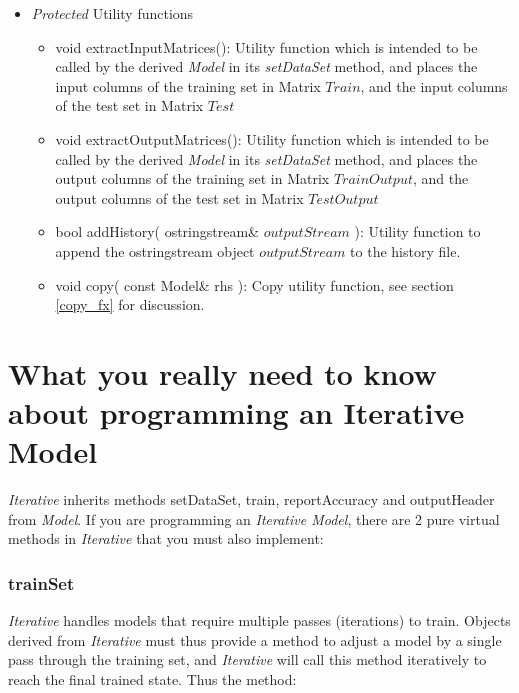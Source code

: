 \documentclass{report}
\def\beginred{\color{red}}
\def\endcolor{\color{black}}
\begin{document}
\begin{itemize}
\item {\em Protected} Utility functions

\begin{itemize}
\item \beginred void extractInputMatrices(): Utility function which is
      intended to be called by the derived {\em Model} in its {\em
      setDataSet} method, and places the input columns of the training
      set in Matrix $Train$, and the input columns of the test set in
      Matrix $Test$ \endcolor
\item \beginred void extractOutputMatrices(): Utility function which
      is intended to be called by the derived {\em Model} in its {\em
      setDataSet} method, and places the output columns of the
      training set in Matrix $TrainOutput$, and the output columns of
      the test set in Matrix $TestOutput$ \endcolor
\item \beginred bool addHistory( ostringstream\& $outputStream$ ):
      Utility function to append the ostringstream object
      $outputStream$
      to the history file. \endcolor
\item \beginred void copy( const Model\& rhs ): Copy utility function,
      see section \ref{copy_fx} for discussion. \endcolor
\end{itemize}

\end{itemize}

\section{What you really need to know about programming an
Iterative Model}

{\em Iterative} inherits methods setDataSet, train, reportAccuracy and
outputHeader from {\em Model}.  If you are programming an {\em
Iterative Model}, there are 2 pure virtual methods in {\em Iterative}
that you must also implement:

\subsubsection{trainSet}

{\em Iterative} handles models that require multiple passes
(iterations) to train.  Objects derived from {\em Iterative} must thus
provide a method to adjust a model by a single pass through the
training set, and {\em Iterative} will call this method iteratively to
reach the final trained state.  Thus the method:
\end{document}
